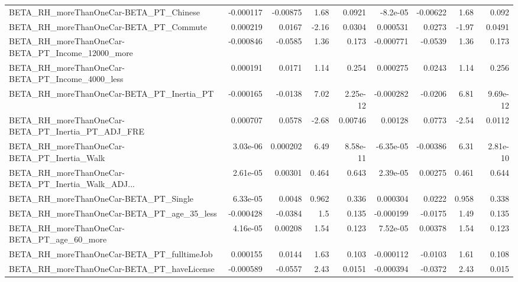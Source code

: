 \begin{tabular}{lrrrrrrrr}
BETA\_RH\_moreThanOneCar-BETA\_PT\_Chinese             &   -0.000117 &     -0.00875 &     1.68 &   0.0921 &   -8.2e-05 &    -0.00622 &         1.68 &         0.092 \\
BETA\_RH\_moreThanOneCar-BETA\_PT\_Commute             &    0.000219 &       0.0167 &    -2.16 &   0.0304 &   0.000531 &      0.0273 &        -1.97 &        0.0491 \\
BETA\_RH\_moreThanOneCar-BETA\_PT\_Income\_12000\_more   &   -0.000846 &      -0.0585 &     1.36 &    0.173 &  -0.000771 &     -0.0539 &         1.36 &         0.173 \\
BETA\_RH\_moreThanOneCar-BETA\_PT\_Income\_4000\_less    &    0.000191 &       0.0171 &     1.14 &    0.254 &   0.000275 &      0.0243 &         1.14 &         0.256 \\
BETA\_RH\_moreThanOneCar-BETA\_PT\_Inertia\_PT          &   -0.000165 &      -0.0138 &     7.02 & 2.25e-12 &  -0.000282 &     -0.0206 &         6.81 &      9.69e-12 \\
BETA\_RH\_moreThanOneCar-BETA\_PT\_Inertia\_PT\_ADJ\_FRE  &    0.000707 &       0.0578 &    -2.68 &  0.00746 &    0.00128 &      0.0773 &        -2.54 &        0.0112 \\
BETA\_RH\_moreThanOneCar-BETA\_PT\_Inertia\_Walk        &    3.03e-06 &     0.000202 &     6.49 & 8.58e-11 &  -6.35e-05 &    -0.00386 &         6.31 &      2.81e-10 \\
BETA\_RH\_moreThanOneCar-BETA\_PT\_Inertia\_Walk\_ADJ... &    2.61e-05 &      0.00301 &    0.464 &    0.643 &   2.39e-05 &     0.00275 &        0.461 &         0.644 \\
BETA\_RH\_moreThanOneCar-BETA\_PT\_Single              &    6.33e-05 &       0.0048 &    0.962 &    0.336 &   0.000304 &      0.0222 &        0.958 &         0.338 \\
BETA\_RH\_moreThanOneCar-BETA\_PT\_age\_35\_less         &   -0.000428 &      -0.0384 &      1.5 &    0.135 &  -0.000199 &     -0.0175 &         1.49 &         0.135 \\
BETA\_RH\_moreThanOneCar-BETA\_PT\_age\_60\_more         &    4.16e-05 &      0.00208 &     1.54 &    0.123 &   7.52e-05 &     0.00378 &         1.54 &         0.123 \\
BETA\_RH\_moreThanOneCar-BETA\_PT\_fulltimeJob         &    0.000155 &       0.0144 &     1.63 &    0.103 &  -0.000112 &     -0.0103 &         1.61 &         0.108 \\
BETA\_RH\_moreThanOneCar-BETA\_PT\_haveLicense         &   -0.000589 &      -0.0557 &     2.43 &   0.0151 &  -0.000394 &     -0.0372 &         2.43 &         0.015 \\

\end{tabular}
